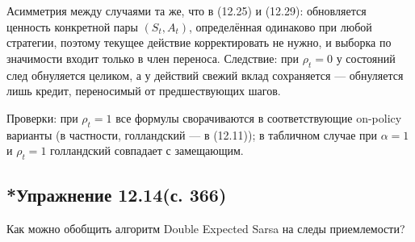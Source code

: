 \begin{solution}
    Асимметрия между случаями та же, что в (12.25) и (12.29): обновляется ценность
    конкретной пары $(S_t,A_t)$, определённая одинаково при любой стратегии,
    поэтому текущее действие корректировать не нужно, и выборка по значимости
    входит только в член переноса. Следствие: при $\rho_t=0$ у состояний след
    обнуляется целиком, а у действий свежий вклад сохраняется --- обнуляется лишь
    кредит, переносимый от предшествующих шагов.

    Проверки: при $\rho_t=1$ все формулы сворачиваются в соответствующие
    on-policy варианты (в частности, голландский --- в (12.11)); в табличном
    случае при $\alpha=1$ и $\rho_t=1$ голландский совпадает с замещающим.
\end{solution}

\subsection{*Упражнение 12.14(с. 366)}
Как можно обобщить алгоритм Double Expected Sarsa на следы приемлемости?

